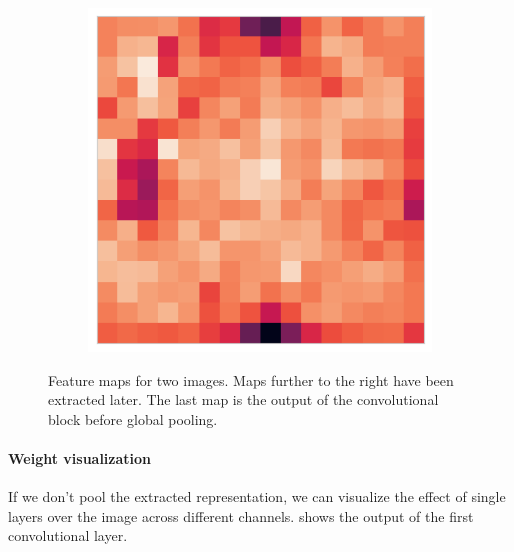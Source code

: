 \begin{figure}
\begin{subfigure}[b]{0.19\textwidth}
     \end{subfigure}
     \hfill
     \begin{subfigure}[b]{0.19\textwidth}
         \centering
         \includegraphics[width=\textwidth, height=\textwidth]{figures/chapter6/features/9521_left/9521_left_4.png}
     \end{subfigure}
     \caption{Feature maps for two images. Maps further to the right have been extracted later. The last map is the output of the convolutional block before global pooling.}
    \label{fig:features}
\end{figure}

\paragraph{Weight visualization}
If we don't pool the extracted representation, we can visualize the effect of single layers over the image across different channels.  shows the output of the first convolutional layer. 

